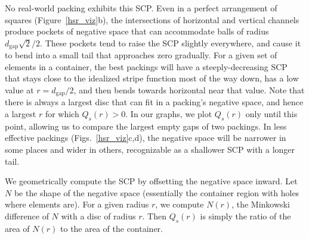 No real-world packing exhibits this SCP.  Even in a perfect arrangement
of squares (Figure~\ref{hsr_viz}b), the intersections of horizontal and
vertical channels
produce pockets of negative space that can accommodate balls of
radius $d_\mathrm{gap}\sqrt{2}/2$.  These pockets tend to raise the SCP
slightly everywhere, and cause it to bend into a small tail that
approaches zero gradually.
For a given set of elements in a container, the best packings will
have a steeply-decreasing SCP that stays close to the idealized stripe function most
of the way down, has a low value at $r=d_\mathrm{gap}/2$,
and then bends towards horizontal near that value.
Note that there is always a largest disc that can fit in a packing's
negative space, and hence a largest $r$ for which $Q_s(r)>0$.  
In our graphs, we plot $Q_s(r)$ only until this point, allowing us
to compare the largest empty gaps of two packings.
In less effective packings (Figs.~\ref{hsr_viz}c,d), the negative space 
will be narrower in
some places and wider in others, recognizable as a shallower SCP
with a longer tail.

We geometrically compute the SCP by offsetting the negative
space inward.  Let $N$ be the shape of the negative space (essentially
the container region with holes where elements are).  For a given radius
$r$, we compute $N(r)$, the Minkowski difference of $N$ with a disc of
radius $r$.  Then $Q_s(r)$ is simply the ratio of the area of $N(r)$ to
the area of the container.

